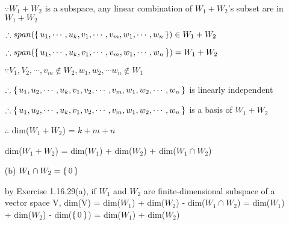 \begin{tcolorbox}
\begin{solution}
\begin{enumerate}
			$\because W_1 + W_2$ is a subspace, any linear combination of $W_1 + W_2$'s subset are in $W_1 + W_2$
			
			$\therefore span(\left\{ \,u_1,\cdots,u_k,v_1,\cdots,v_m,w_1,\cdots,w_n \,\right\}) \in W_1 + W_2$
			
			$\therefore span(\left\{ \,u_1,\cdots,u_k,v_1,\cdots,v_m,w_1,\cdots,w_n \,\right\}) = W_1 + W_2$
			
			
			$\because V_1,V_2,\cdots,v_m \notin W_2,w_1,w_2,\cdots w_n \notin W_1$
			
			$\therefore \left\{ \,u_1,u_2,\cdots,u_k,v_1,v_2,\cdots,v_m,w_1,w_2,\cdots,w_n \,\right\}$ is linearly independent
			
			$\therefore \left\{ \,u_1,u_2,\cdots,u_k,v_1,v_2,\cdots,v_m,w_1,w_2,\cdots,w_n \,\right\}$ is a basis of $W_1 + W_2$
			
			
			$\therefore$ dim($W_1 + W_2$) = $k+m+n$
			
			dim($W_1 + W_2$) = dim($W_1$) + dim($W_2$) + dim($W_1 \cap W_2$)
			
			
			\item[(b)] $W_1 \cap W_2 = \left\{ \,0 \,\right\}$
			
			by Exercise 1.16.29(a), if $W_1$ and $W_2$ are finite-dimensional subspace of a vector space V, dim(V) = dim($W_1$) + dim($W_2$) - dim($W_1 \cap W_2$) = dim($W_1$) + dim($W_2$) - dim($\left\{ \,0 \,\right\}$) = dim($W_1$) + dim($W_2$)
			
		\end{enumerate}
	\end{solution}
\end{tcolorbox}
